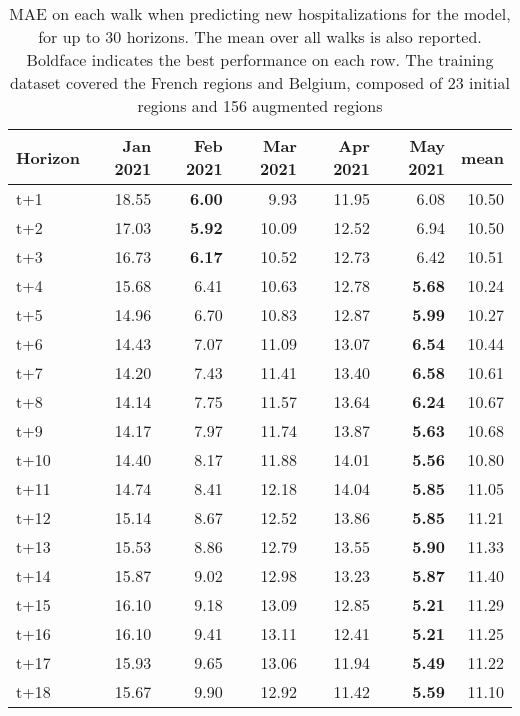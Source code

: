 \begin{table}[H]
\centering
\caption{MAE on each walk when predicting new hospitalizations for the model, for up to 30 horizons. The mean over all walks is also reported. Boldface indicates the best performance on each row. The training dataset covered the French regions and Belgium, composed of 23 initial regions and 156 augmented regions }
\label{tab:MAE_walk_encoder_decoder}
\begin{tabular}{lrrrrrr}
\toprule
Horizon &  Jan 2021 &  Feb 2021 &  Mar 2021 &  Apr 2021 &  May 2021 &  mean \\
\midrule
t+1  & 18.55  & \textbf{6.00}  & 9.93  & 11.95  & 6.08  & 10.50  \\
t+2  & 17.03  & \textbf{5.92}  & 10.09  & 12.52  & 6.94  & 10.50  \\
t+3  & 16.73  & \textbf{6.17}  & 10.52  & 12.73  & 6.42  & 10.51  \\
t+4  & 15.68  & 6.41  & 10.63  & 12.78  & \textbf{5.68}  & 10.24  \\
t+5  & 14.96  & 6.70  & 10.83  & 12.87  & \textbf{5.99}  & 10.27  \\
t+6  & 14.43  & 7.07  & 11.09  & 13.07  & \textbf{6.54}  & 10.44  \\
t+7  & 14.20  & 7.43  & 11.41  & 13.40  & \textbf{6.58}  & 10.61  \\
t+8  & 14.14  & 7.75  & 11.57  & 13.64  & \textbf{6.24}  & 10.67  \\
t+9  & 14.17  & 7.97  & 11.74  & 13.87  & \textbf{5.63}  & 10.68  \\
t+10  & 14.40  & 8.17  & 11.88  & 14.01  & \textbf{5.56}  & 10.80  \\
t+11  & 14.74  & 8.41  & 12.18  & 14.04  & \textbf{5.85}  & 11.05  \\
t+12  & 15.14  & 8.67  & 12.52  & 13.86  & \textbf{5.85}  & 11.21  \\
t+13  & 15.53  & 8.86  & 12.79  & 13.55  & \textbf{5.90}  & 11.33  \\
t+14  & 15.87  & 9.02  & 12.98  & 13.23  & \textbf{5.87}  & 11.40  \\
t+15  & 16.10  & 9.18  & 13.09  & 12.85  & \textbf{5.21}  & 11.29  \\
t+16  & 16.10  & 9.41  & 13.11  & 12.41  & \textbf{5.21}  & 11.25  \\
t+17  & 15.93  & 9.65  & 13.06  & 11.94  & \textbf{5.49}  & 11.22  \\
t+18  & 15.67  & 9.90  & 12.92  & 11.42  & \textbf{5.59}  & 11.10  \\

\end{tabular}
\end{table}
